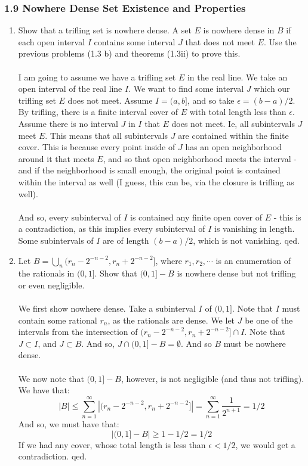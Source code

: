 \documentclass[12pt,a4paper]{article}
\newcommand{\1}[1]{\mathbbm{1}\left\{ #1 \right\}}
\begin{document}
\subsubsection{1.9 Nowhere Dense Set Existence and Properties} 
\begin{enumerate}
	\item Show that a trifling set is nowhere dense. A set $E$ is nowhere dense in $B$ if each open interval $I$ contains some interval $J$ that does not meet $E$. Use the previous problems (1.3 b) and theorems (1.3ii) to prove this.
	\\\\
	I am going to assume we have a trifling set $E$ in the real line. We take an open interval of the real line $I$. We want to find some interval $J$ which our trifling set $E$ does not meet. Assume $I = (a,b]$, and so take $\epsilon = (b - a)/2$. By trifling, there is a finite interval cover of $E$ with total length less than $\epsilon$. Assume there is no interval $J$ in $I$ that $E$ does not meet. Ie, all subintervals $J$ meet $E$. This means that all subintervals $J$ are contained within the finite cover. This is because every point inside of $J$ has an open neighborhood around it that meets $E$, and so that open neighborhood meets the interval - and if the neighborhood is small enough, the original point is contained within the interval as well (I guess, this can be, via the closure is trifling as well).
	\\\\
	And so, every subinterval of $I$ is contained any finite open cover of $E$ - this is a contradiction, as this implies every subinterval of $I$ is vanishing in length. Some subintervals of $I$ are of length $(b-a)/2$, which is not vanishing. qed.
	
	\item Let $B = \bigcup_n (r_n - 2^{-n-2}, r_n + 2^{-n-2}]$, where $r_1, r_2, \cdots$ is an enumeration of the rationals in $(0,1]$. Show that $(0,1] - B$ is nowhere dense but not trifling or even negligible.
	\\\\
	We first show nowhere dense. Take a subinterval $I$ of $(0,1]$. Note that $I$ must contain some rational $r_n$, as the rationals are dense. We let $J$ be one of the intervals from the intersection of $(r_n - 2^{-n-2}, r_n + 2^{-n-2}] \cap I$. Note that $J \subset I$, and $J \subset B$. And so, $J \cap (0,1] - B = \emptyset$. And so $B$ must be nowhere dense.
	\\\\
	We now note that $(0,1]-B$, however, is not negligible (and thus not trifling). We have that:
	$$
		|B| \leq \sum_{n=1}^\infty |(r_n - 2^{-n-2}, r_n + 2^{-n-2}]| = \sum_{n=1}^\infty \frac{1}{2^{n+1}} = 1/2
	$$
	And so, we must have that:
	$$
		|(0,1]-B| \geq 1 - 1/2 = 1/2
	$$
	If we had any cover, whose total length is less than $\epsilon < 1/2$, we would get a contradiction. qed.
	

\end{enumerate}
\end{document}
